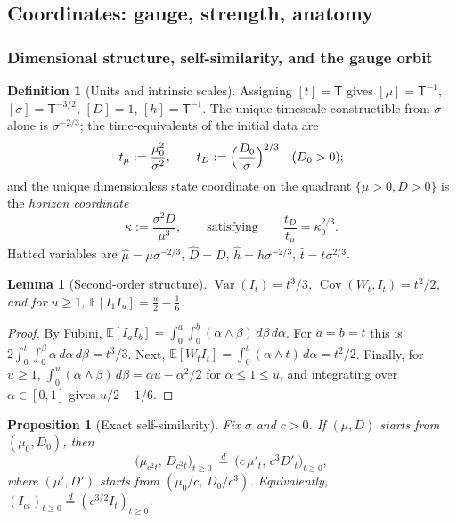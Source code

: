\documentclass[11pt]{article}
\numberwithin{equation}{section}
\theoremstyle{plain}
\newtheorem{proposition}[theorem]{Proposition}
\newtheorem{lemma}[theorem]{Lemma}
\theoremstyle{definition}
\newtheorem{definition}[theorem]{Definition}
\theoremstyle{remark}
\newcommand{\E}{\mathbb{E}}
\DeclareMathOperator{\Var}{Var}
\DeclareMathOperator{\Cov}{Cov}
\newcommand{\eqd}{\overset{d}{=}}
\begin{document}
\subsection{Coordinates: gauge, strength, anatomy}\label{gr1:sub:coords}\label{tc:sub:polar}

\subsubsection{Dimensional structure, self-similarity, and the gauge orbit}
\label{sh:subsub:dimensional}

\begin{definition}[Units and intrinsic scales]\label{sh:def:units}
Assigning $[t]=\mathsf T$ gives $[\mu]=\mathsf T^{-1}$,
$[\sigma]=\mathsf T^{-3/2}$, $[D]=1$, $[h]=\mathsf T^{-1}$. The unique
timescale constructible from $\sigma$ alone is $\sigma^{-2/3}$; the
time-equivalents of the initial data are
\begin{equation}\label{sh:eq:timescales}
t_\mu:=\frac{\mu_0^2}{\sigma^2},\qquad
t_D:=\Bigl(\frac{D_0}{\sigma}\Bigr)^{2/3}\quad(D_0>0);
\end{equation}
and the unique dimensionless state coordinate on the quadrant
$\{\mu>0,D>0\}$ is the \emph{horizon coordinate}
\begin{equation}\label{sh:eq:kappa}
\kappa:=\frac{\sigma^2D}{\mu^3},\qquad\text{satisfying}\qquad
\frac{t_D}{t_\mu}=\kappa_0^{2/3}.
\end{equation}
Hatted variables are $\hat\mu=\mu\sigma^{-2/3}$, $\hat D=D$,
$\hat h=h\sigma^{-2/3}$, $\hat t=t\sigma^{2/3}$.
\end{definition}

\begin{lemma}[Second-order structure]\label{sh:lem:secondorder}
$\Var(I_t)=t^3/3$, $\Cov(W_t,I_t)=t^2/2$, and for $u\ge1$,
$\E[I_1I_u]=\tfrac u2-\tfrac16$.
\end{lemma}

\begin{proof}
By Fubini, $\E[I_aI_b]=\int_0^a\!\int_0^b(\alpha\wedge\beta)\,d\beta\,d\alpha$.
For $a=b=t$ this is $2\int_0^t\!\int_0^\beta\alpha\,d\alpha\,d\beta=t^3/3$.
Next, $\E[W_tI_t]=\int_0^t(\alpha\wedge t)\,d\alpha=t^2/2$. Finally, for
$u\ge1$, $\int_0^u(\alpha\wedge\beta)\,d\beta
=\alpha u-\alpha^2/2$ for $\alpha\le1\le u$, and integrating over
$\alpha\in[0,1]$ gives $u/2-1/6$.
\end{proof}

\begin{proposition}[Exact self-similarity]\label{sh:prop:selfsim}
Fix $\sigma$ and $c>0$. If $(\mu,D)$ starts from $(\mu_0,D_0)$, then
\[
\bigl(\mu_{c^2t},\,D_{c^2t}\bigr)_{t\ge0}\ \eqd\
\bigl(c\,\mu'_t,\,c^3D'_t\bigr)_{t\ge0},
\]
where $(\mu',D')$ starts from $(\mu_0/c,\,D_0/c^3)$. Equivalently,
$(I_{ct})_{t\ge0}\eqd(c^{3/2}I_t)_{t\ge0}$.
\end{proposition}
\end{document}
